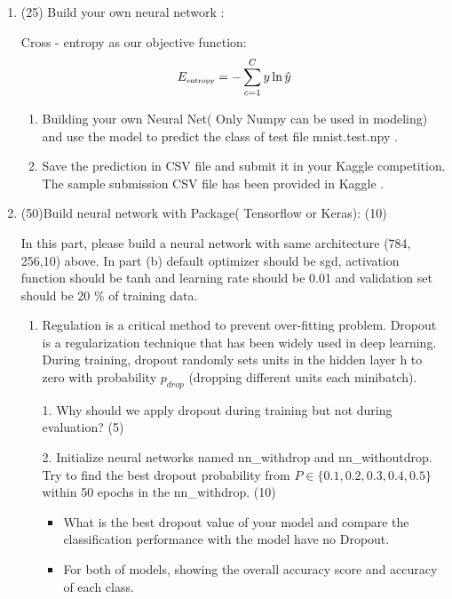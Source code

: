 \documentclass[12pt,epsf]{article}
\begin{document}
\begin{enumerate}
\begin{enumerate}
\item (25) Build your own neural network :  

Cross - entropy as our objective function:
\begin{equation}
  \label{eq:twoentropy}
E_{\mbox{\tiny entropy}} = -\sum_{c=1}^C  y \ln \hat{y}
\end{equation}
\begin{enumerate}

\item Building your own Neural Net( Only Numpy can be used in modeling) and use the model to predict the class of test file mnist.test.npy . 
\item Save the prediction in CSV file and submit it in your Kaggle competition. The sample submission CSV file has been provided in Kaggle . 

\end{enumerate}




\item (50)Build neural network with Package( Tensorflow or Keras): (10)

In this part, please build a neural network with same architecture (784, 256,10) above. In part (b) default optimizer should be sgd, activation function should be tanh and learning rate should be 0.01 and validation set should be 20 \% of training data. 

\begin{enumerate}

\item Regulation is a critical method to prevent over-fitting problem. Dropout is a regularization technique that has been widely used in deep learning. During training, dropout randomly sets units in the hidden layer h to zero with probability $p_{drop}$ (dropping different units each minibatch).

1. Why should we apply dropout during training but not during evaluation? (5)

2. Initialize neural networks named nn\_withdrop and nn\_withoutdrop.  Try to find the best dropout probability from $P\in\{0.1,0.2,0.3,0.4,0.5\}$  within 50 epochs in the nn\_withdrop. (10)
\begin{itemize}
\item	What is the best dropout value of your model and compare the classification performance with the model have no Dropout. 
\item  For both of models, showing the overall accuracy score and accuracy of each class.
\end{itemize}


\end{enumerate}
\end{enumerate}
\end{enumerate}
\end{document}
